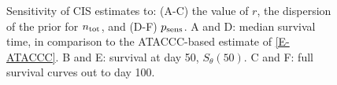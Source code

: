 \documentclass[thesis.tex]{subfiles}
\begin{document}
\begin{figure}
  \vspace{-2.5cm}
  \caption{%
    Sensitivity of CIS estimates to: (A-C) the value of $r$, the dispersion of the prior for $n_\text{tot}$, and (D-F) $p_\text{sens}$.
    A and D: median survival time, in comparison to the ATACCC-based estimate of \cref{E-ATACCC}.
    B and E: survival at day 50, $S_\theta(50)$.
    C and F: full survival curves out to day 100.
  }
  \label{imperf-test:fig:cis-sensitivity}
\end{figure}
\end{document}
